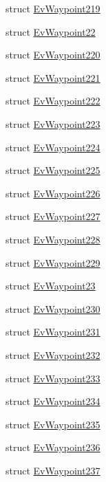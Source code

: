 \begin{DoxyCompactItemize}
struct \hyperlink{structmove__base__z__client_1_1EvWaypoint219}{Ev\+Waypoint219}
\item 
struct \hyperlink{structmove__base__z__client_1_1EvWaypoint22}{Ev\+Waypoint22}
\item 
struct \hyperlink{structmove__base__z__client_1_1EvWaypoint220}{Ev\+Waypoint220}
\item 
struct \hyperlink{structmove__base__z__client_1_1EvWaypoint221}{Ev\+Waypoint221}
\item 
struct \hyperlink{structmove__base__z__client_1_1EvWaypoint222}{Ev\+Waypoint222}
\item 
struct \hyperlink{structmove__base__z__client_1_1EvWaypoint223}{Ev\+Waypoint223}
\item 
struct \hyperlink{structmove__base__z__client_1_1EvWaypoint224}{Ev\+Waypoint224}
\item 
struct \hyperlink{structmove__base__z__client_1_1EvWaypoint225}{Ev\+Waypoint225}
\item 
struct \hyperlink{structmove__base__z__client_1_1EvWaypoint226}{Ev\+Waypoint226}
\item 
struct \hyperlink{structmove__base__z__client_1_1EvWaypoint227}{Ev\+Waypoint227}
\item 
struct \hyperlink{structmove__base__z__client_1_1EvWaypoint228}{Ev\+Waypoint228}
\item 
struct \hyperlink{structmove__base__z__client_1_1EvWaypoint229}{Ev\+Waypoint229}
\item 
struct \hyperlink{structmove__base__z__client_1_1EvWaypoint23}{Ev\+Waypoint23}
\item 
struct \hyperlink{structmove__base__z__client_1_1EvWaypoint230}{Ev\+Waypoint230}
\item 
struct \hyperlink{structmove__base__z__client_1_1EvWaypoint231}{Ev\+Waypoint231}
\item 
struct \hyperlink{structmove__base__z__client_1_1EvWaypoint232}{Ev\+Waypoint232}
\item 
struct \hyperlink{structmove__base__z__client_1_1EvWaypoint233}{Ev\+Waypoint233}
\item 
struct \hyperlink{structmove__base__z__client_1_1EvWaypoint234}{Ev\+Waypoint234}
\item 
struct \hyperlink{structmove__base__z__client_1_1EvWaypoint235}{Ev\+Waypoint235}
\item 
struct \hyperlink{structmove__base__z__client_1_1EvWaypoint236}{Ev\+Waypoint236}
\item 
struct \hyperlink{structmove__base__z__client_1_1EvWaypoint237}{Ev\+Waypoint237}

\end{DoxyCompactItemize}
